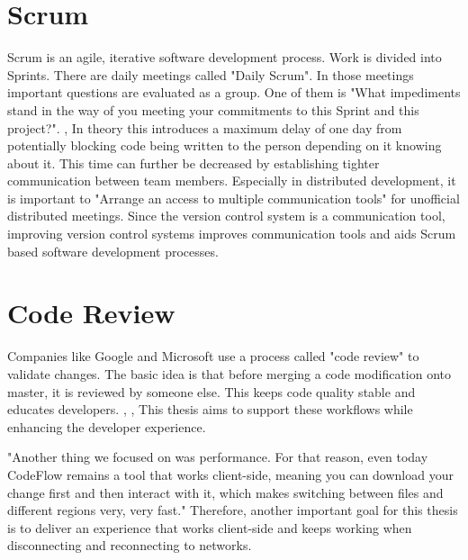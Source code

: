 \section{Scrum}
Scrum is an agile, iterative software development process. Work is divided into Sprints. There are daily meetings called "Daily Scrum". In those meetings important questions are evaluated as a group. One of them is "What impediments stand in the way of you meeting your commitments to this Sprint and this project?". \cite{schwaber2004agile}, \cite{10.1007/978-1-4471-0947-1_11}
In theory this introduces a maximum delay of one day from potentially blocking code being written to the person depending on it knowing about it. This time can further be decreased by establishing tighter communication between team members.
Especially in distributed development, it is important to "Arrange an access to multiple communication tools" \cite{5196933} for unofficial distributed meetings. \cite{4638656}
Since the version control system is a communication tool, improving version control systems improves communication tools and aids Scrum based software development processes.

\section{Code Review}

Companies like Google and Microsoft use a process called "code review" to validate changes. The basic idea is that before merging a code modification onto master, it is reviewed by someone else. This keeps code quality stable and educates developers. \cite{SadowskiSoederbergChurchSipkoBacchelli:2018:Moderncodereview:acasestudyatgoogle}, \cite{Bacchelli:2013:EOC:2486788.2486882}, \cite{7081824} This thesis aims to support these workflows while enhancing the developer experience. 

"Another thing we focused on was performance. For that
reason, even today CodeFlow remains a tool that works
client-side, meaning you can download your change first
and then interact with it, which makes switching between
files and different regions very, very fast." \cite{CzerwonkaGreilerBirdPanjerCoatta:2018:CodeFlow:ImprovingtheCodeReviewProcessatMicrosoft} Therefore, another important goal for this thesis is to deliver an experience that works client-side and keeps working when disconnecting and reconnecting to networks.